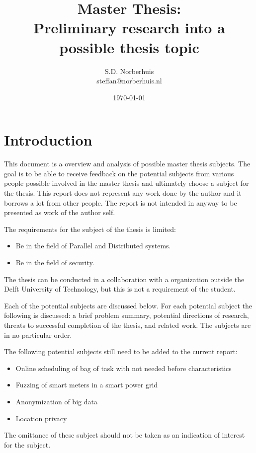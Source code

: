 \documentclass{article}
\title{Master Thesis:\\ Preliminary research into a possible thesis topic}
\author{S.D. Norberhuis\\steffan@norberhuis.nl}
\date{\today}
\begin{document}
\maketitle

\tableofcontents

\section{Introduction}
This document is a overview and analysis of possible master thesis subjects.
The goal is to be able to receive feedback on the potential subjects from various people possible involved in the master thesis
and ultimately choose a subject for the thesis.
This report does not represent any work done by the author and it borrows a lot from other people.
The report is not intended in anyway to be presented as work of the author self.

The requirements for the subject of the thesis is limited:
\begin{itemize}
\item Be in the field of Parallel and Distributed systems.
\item Be in the field of security.
\end{itemize}
The thesis can be conducted in a collaboration with a organization outside the Delft University of Technology,
but this is not a requirement of the student. 

Each of the potential subjects are discussed below.
For each potential subject the following is discussed: 
a brief problem summary, potential directions of research, threats to successful completion of the thesis, and related work.
The subjects are in no particular order.

The following potential subjects still need to be added to the current report:
\begin{itemize}
	\item Online scheduling of bag of task with not needed before characteristics
	\item Fuzzing of smart meters in a smart power grid
	\item Anonymization of big data
	\item Location privacy
\end{itemize}
The omittance of these subject should not be taken as an indication of interest for the subject.









\end{document}
